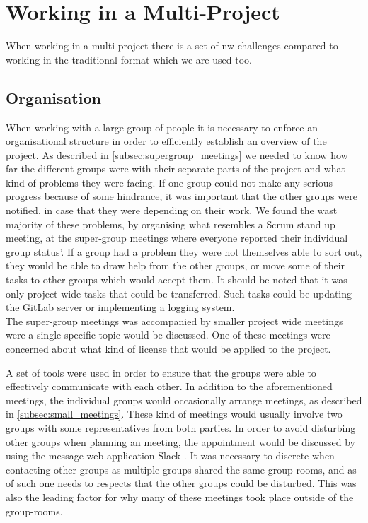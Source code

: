 \section{Working in a Multi-Project}
When working in a multi-project there is a set of nw challenges compared to working in the traditional format which we are used too.

\subsection{Organisation}
When working with a large group of people it is necessary to enforce an organisational structure in order to efficiently establish an overview of the project. As described in \cref{subsec:supergroup_meetings} we needed to know how far the different groups were with their separate parts of the project and what kind of problems they were facing. If one group could not make any serious progress because of some hindrance, it was important that the other groups were notified, in case that they were depending on their work. We found the wast majority of these problems, by organising what resembles a Scrum stand up meeting, at the super-group meetings where everyone reported their individual group status'. If a group had a problem they were not themselves able to sort out, they would be able to draw help from the other groups, or move some of their tasks to other groups which would accept them. It should be noted that it was only project wide tasks that could be transferred. Such tasks could be updating the GitLab server or implementing a logging system. \\
The super-group meetings was accompanied by smaller project wide meetings were a single specific topic would be discussed. One of these meetings were concerned about what kind of license that would be applied to the project.

A set of tools were used in order to ensure that the groups were able to effectively communicate with each other. In addition to the aforementioned meetings, the individual groups would occasionally arrange meetings, as described in \cref{subsec:small_meetings}. These kind of meetings would usually involve two groups with some representatives from both parties. In order to avoid disturbing other groups when planning an meeting, the appointment would be discussed by using the message web application Slack \cite{slack}. It was necessary to discrete when contacting other groups as multiple groups shared the same group-rooms, and as of such one needs to respects that the other groups could be disturbed. This was also the leading factor for why many of these meetings took place outside of the group-rooms.

